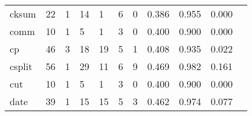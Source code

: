 \begin{longtable}{lp{1.20cm}p{1.20cm}p{1.20cm}p{1.20cm}p{1.20cm}p{1.20cm}p{1.20cm}p{1.20cm}p{1.20cm}p{1.20cm}}
cksum     &                                    22 &                                                  1 &                                                 14 &                                                  1 &                                                  6 &                                                  0 &                                         0.386 &                                              0.955 &                                              0.000 \\
comm      &                                    10 &                                                  1 &                                                  5 &                                                  1 &                                                  3 &                                                  0 &                                         0.400 &                                              0.900 &                                              0.000 \\
cp        &                                    46 &                                                  3 &                                                 18 &                                                 19 &                                                  5 &                                                  1 &                                         0.408 &                                              0.935 &                                              0.022 \\
csplit    &                                    56 &                                                  1 &                                                 29 &                                                 11 &                                                  6 &                                                  9 &                                         0.469 &                                              0.982 &                                              0.161 \\
cut       &                                    10 &                                                  1 &                                                  5 &                                                  1 &                                                  3 &                                                  0 &                                         0.400 &                                              0.900 &                                              0.000 \\
date      &                                    39 &                                                  1 &                                                 15 &                                                 15 &                                                  5 &                                                  3 &                                         0.462 &                                              0.974 &                                              0.077 \\

\end{longtable}
